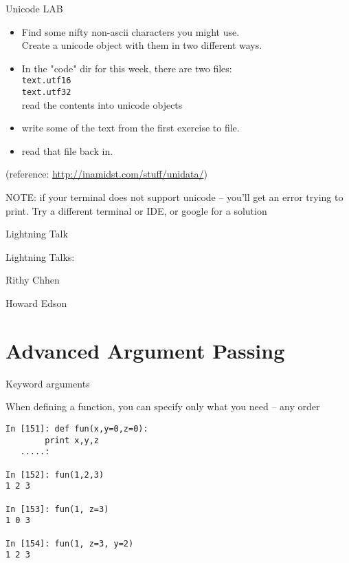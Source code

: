 \documentclass{beamer}
\begin{document}
\begin{frame}[fragile]{Unicode LAB}

\begin{itemize}
  \item Find some nifty non-ascii characters you might use.\\
        Create a unicode object with them in two different ways.
  \item In the "code" dir for this week, there are two files:\\
        \verb|text.utf16| \\
        \verb|text.utf32| \\
        read the contents into unicode objects
  \item write some of the text from the first exercise to file.
  \item read that file back in.
\end{itemize}

\vfill
(reference: \url{http://inamidst.com/stuff/unidata/})

\vfill
NOTE: if your terminal does not support unicode -- you'll get an error trying
to print. Try a different terminal or IDE, or google for a solution
\end{frame}



\begin{frame}{Lightning Talk}

{\LARGE Lightning Talks:}

{\large 
\vfill
Rithy Chhen

\vfill
Howard Edson
}

\end{frame}

\section{Advanced Argument Passing}


\begin{frame}[fragile]{Keyword arguments}

 {\Large When defining a function, you can specify only
         what you need -- any order}

\begin{verbatim}
In [151]: def fun(x,y=0,z=0):
        print x,y,z
   .....:     

In [152]: fun(1,2,3)
1 2 3

In [153]: fun(1, z=3)
1 0 3

In [154]: fun(1, z=3, y=2)
1 2 3
\end{verbatim}

\end{frame} 
\end{document}
